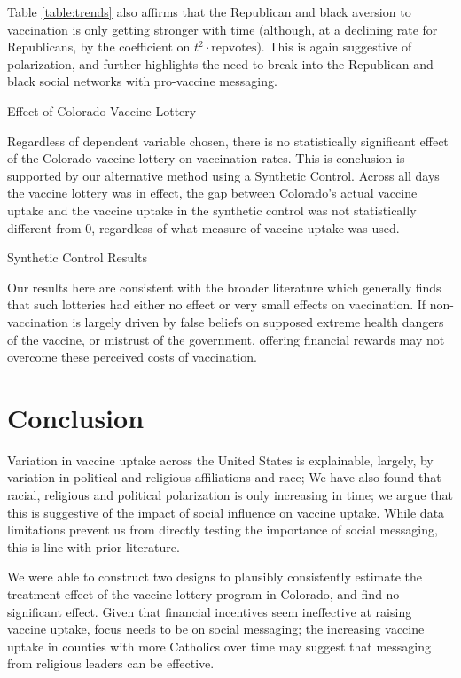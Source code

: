 \documentclass[12pt]{article}
\begin{document}
\begin{spacing}{1.5}
		Table \ref{table:trends} also affirms that the Republican and black aversion to vaccination is only getting stronger with time (although, at a declining rate for Republicans, by the coefficient on $t^2\cdot \textrm{repvotes}$). This is again suggestive of polarization, and further highlights the need to break into the Republican and black social networks with pro-vaccine messaging.
		
		\begin{table}
			\centering
			\caption{Effect of Colorado Vaccine Lottery}
			\centerline{}
			\label{table:didresults}
		\end{table}
		
		Regardless of dependent variable chosen, there is no statistically significant effect of the Colorado vaccine lottery on vaccination rates. This is conclusion is supported by our alternative method using a Synthetic Control. Across all days the vaccine lottery was in effect, the gap between Colorado's actual vaccine uptake and the vaccine uptake in the synthetic control was not statistically different from 0, regardless of what measure of vaccine uptake was used.
		
		\begin{table}
			\caption{Synthetic Control Results}
			
		\end{table}
		
		Our results here are consistent with the broader literature which generally finds that such lotteries had either no effect or very small effects on vaccination. If non-vaccination is largely driven by false beliefs on supposed extreme health dangers of the vaccine, or mistrust of the government, offering financial rewards may not overcome these perceived costs of vaccination.
		
		\section{Conclusion}
		Variation in vaccine uptake across the United States is explainable, largely, by variation in political and religious affiliations and race; We have also found that racial, religious and political polarization is only increasing in time; we argue that this is suggestive of the impact of social influence on vaccine uptake. While data limitations prevent us from directly testing the importance of social messaging, this is line with prior literature.
		
		We were able to construct two designs to plausibly consistently estimate the treatment effect of the vaccine lottery program in Colorado, and find no significant effect. Given that financial incentives seem ineffective at raising vaccine uptake, focus needs to be on social messaging; the increasing vaccine uptake in counties with more Catholics over time may suggest that messaging from religious leaders can be effective.
		
		\pagebreak
		\printbibliography
		
	\end{spacing}
\end{document}
